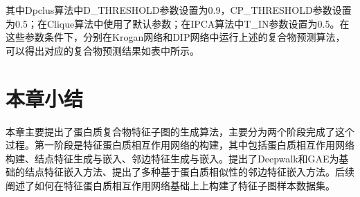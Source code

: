 其中Dpclus算法中D\_THRESHOLD参数设置为0.9，CP\_THRESHOLD参数设置为0.5；在Clique算法中使用了默认参数；在IPCA算法中T\_IN参数设置为0.5。在这些参数条件下，分别在Krogan网络和DIP网络中运行上述的复合物预测算法，可以得出对应的复合物预测结果如表中所示。

\section{本章小结}
\label{section:FeatSubNetworkConstruct:summary}

本章主要提出了蛋白质复合物特征子图的生成算法，主要分为两个阶段完成了这个过程。第一阶段是特征蛋白质相互作用网络的构建，其中包括蛋白质相互作用网络构建、结点特征生成与嵌入、邻边特征生成与嵌入。提出了Deepwalk和GAE为基础的结点特征嵌入方法、提出了多种基于蛋白质相似性的邻边特征嵌入方法。后续阐述了如何在特征蛋白质相互作用网络基础上上构建了特征子图样本数据集。
